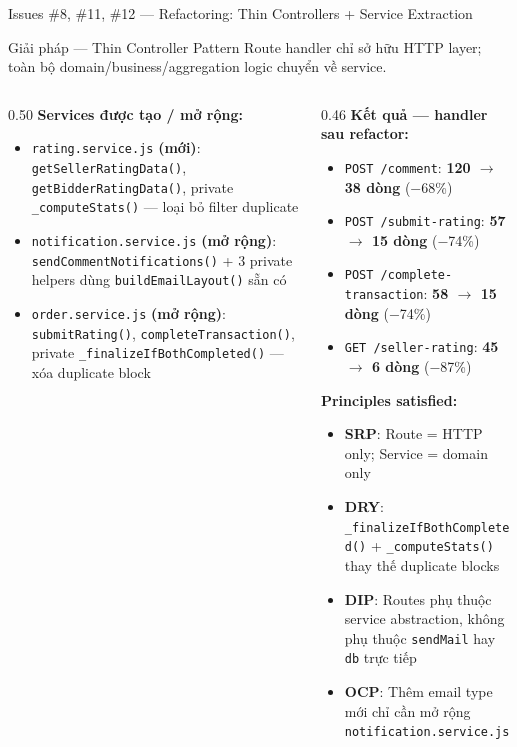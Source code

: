 \documentclass[12pt]{beamer}
\begin{document}
\begin{frame}[fragile]{Issues \#8, \#11, \#12 — Refactoring: Thin Controllers + Service Extraction}
  \begin{block}{Giải pháp — Thin Controller Pattern}
    Route handler chỉ sở hữu HTTP layer; toàn bộ domain/business/aggregation logic chuyển về service.
  \end{block}

  \begin{columns}[T]
    \begin{column}{0.50\textwidth}
      \textbf{Services được tạo / mở rộng:}
      \begin{itemize}
        \item \texttt{rating.service.js} \textbf{(mới)}: \texttt{getSellerRatingData()},
              \texttt{getBidderRatingData()}, private \texttt{\_computeStats()} — loại bỏ filter duplicate
        \item \texttt{notification.service.js} \textbf{(mở rộng)}: \texttt{sendCommentNotifications()} +
              3 private helpers dùng \texttt{buildEmailLayout()} sẵn có
        \item \texttt{order.service.js} \textbf{(mở rộng)}: \texttt{submitRating()},
              \texttt{completeTransaction()}, private \texttt{\_finalizeIfBothCompleted()} — xóa duplicate block
      \end{itemize}
    \end{column}
    \begin{column}{0.46\textwidth}
      \textbf{Kết quả — handler sau refactor:}
      \begin{itemize}
        \item \texttt{POST /comment}: \textbf{120 $\to$ 38 dòng} ($-$68\%)
        \item \texttt{POST /submit-rating}: \textbf{57 $\to$ 15 dòng} ($-$74\%)
        \item \texttt{POST /complete-transaction}: \textbf{58 $\to$ 15 dòng} ($-$74\%)
        \item \texttt{GET /seller-rating}: \textbf{45 $\to$ 6 dòng} ($-$87\%)
      \end{itemize}

      \medskip
      \textbf{Principles satisfied:}
      \begin{itemize}
        \item \textbf{SRP}: Route = HTTP only; Service = domain only
        \item \textbf{DRY}: \texttt{\_finalizeIfBothCompleted()} + \texttt{\_computeStats()} thay thế duplicate blocks
        \item \textbf{DIP}: Routes phụ thuộc service abstraction, không phụ thuộc \texttt{sendMail} hay \texttt{db} trực tiếp
        \item \textbf{OCP}: Thêm email type mới chỉ cần mở rộng \texttt{notification.service.js}
      \end{itemize}
    \end{column}
  \end{columns}
\end{frame}
\end{document}
